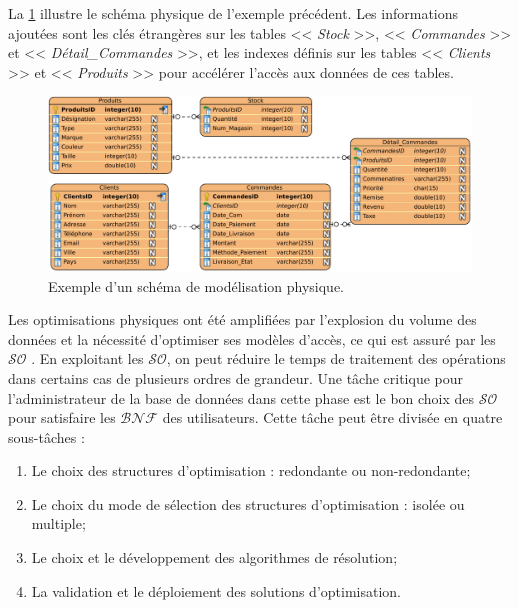 \begin{example}
La \ref{fig:physical-design-ex} illustre le schéma physique de l'exemple précédent. Les informations ajoutées sont les clés étrangères sur les tables << \textit{Stock} >>, << \textit{Commandes} >> et << \textit{Détail\_Commandes} >>, et les indexes définis sur les tables << \textit{Clients} >> et << \textit{Produits} >> pour accélérer l'accès aux données de ces tables.\end{example}

\begin{figure}
\begin{center}
\includegraphics[scale=0.6]{chapitre2/chap2Fig/physical-design-ex.pdf}
\caption{Exemple d'un schéma de modélisation physique.}
\label{fig:physical-design-ex}
\end{center}
\end{figure}

Les optimisations physiques ont été amplifiées par l'explosion du volume des données et la nécessité d'optimiser ses modèles d'accès, ce qui est assuré par les $\mathcal{SO}$ \cite{ChaudhuriN07}. En exploitant les $\mathcal{SO}$, on peut réduire le temps de traitement des opérations dans certains cas de plusieurs ordres de grandeur. Une tâche critique pour l'administrateur de la base de données dans cette phase est le bon choix des $\mathcal{SO}$ pour satisfaire les $\mathcal{BNF}$ des utilisateurs. Cette tâche peut être divisée en quatre sous-tâches \cite{BellatrecheHdr09} :

\begin{enumerate}
 \item Le choix des structures d’optimisation : redondante ou non-redondante;
 \item Le choix du mode de sélection des structures d'optimisation : isolée ou multiple;
 \item Le choix et le développement des algorithmes de résolution;
 \item La validation et le déploiement des solutions d’optimisation.
\end{enumerate}

